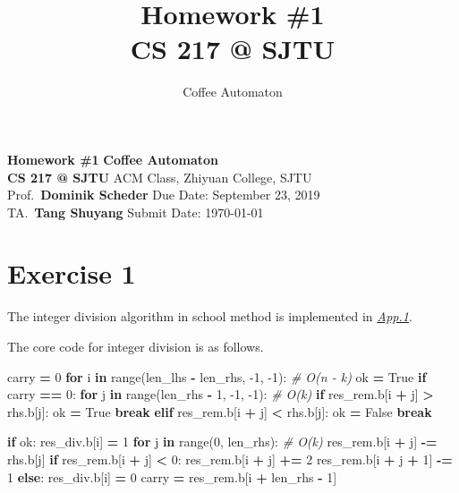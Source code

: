 \documentclass[
]{article}
\title{
  \vspace{2in}
  \textmd{\textbf{Homework \#1}}
  \normalsize\vspace{0.1in}\\
  \textmd{\textbf{CS 217 @ SJTU}}
  \normalsize\vspace{0.1in}\\
}
\author{Coffee Automaton}
\date{}
\newenvironment{Shaded}{\begin{snugshade}}{\end{snugshade}}
\newcommand{\BuiltInTok}[1]{#1}
\newcommand{\CommentTok}[1]{\textcolor[rgb]{0.56,0.35,0.01}{\textit{#1}}}
\newcommand{\ControlFlowTok}[1]{\textcolor[rgb]{0.13,0.29,0.53}{\textbf{#1}}}
\newcommand{\DecValTok}[1]{\textcolor[rgb]{0.00,0.00,0.81}{#1}}
\newcommand{\KeywordTok}[1]{\textcolor[rgb]{0.13,0.29,0.53}{\textbf{#1}}}
\newcommand{\NormalTok}[1]{#1}
\newcommand{\OperatorTok}[1]{\textcolor[rgb]{0.81,0.36,0.00}{\textbf{#1}}}
\newcommand{\VariableTok}[1]{\textcolor[rgb]{0.00,0.00,0.00}{#1}}
\begin{document}
\noindent
\large\textbf{Homework \#1}
\hfill
\textbf{Coffee Automaton} \\
\normalsize {\bf CS 217 @ SJTU} \hfill ACM Class, Zhiyuan College, SJTU\\
Prof.~{\bf Dominik Scheder} \hfill Due Date: September 23, 2019\\
  TA.~{\bf Tang Shuyang}
\hfill Submit Date: \today


\hypertarget{exercise-1}{%
\section{Exercise 1}\label{exercise-1}}

The integer division algorithm in school method is implemented in
\emph{\protect\hyperlink{appendix-1-euclidean-algorithm}{App.1}}.

The core code for integer division is as follows.

\begin{Shaded}
\begin{Highlighting}[]
\NormalTok{carry }\OperatorTok{=} \DecValTok{0}
\ControlFlowTok{for}\NormalTok{ i }\KeywordTok{in} \BuiltInTok{range}\NormalTok{(len_lhs }\OperatorTok{-}\NormalTok{ len_rhs, }\DecValTok{-1}\NormalTok{, }\DecValTok{-1}\NormalTok{):  }\CommentTok{# O(n - k)}
\NormalTok{    ok }\OperatorTok{=} \VariableTok{True}
    \ControlFlowTok{if}\NormalTok{ carry }\OperatorTok{==} \DecValTok{0}\NormalTok{:}
        \ControlFlowTok{for}\NormalTok{ j }\KeywordTok{in} \BuiltInTok{range}\NormalTok{(len_rhs }\OperatorTok{-} \DecValTok{1}\NormalTok{, }\DecValTok{-1}\NormalTok{, }\DecValTok{-1}\NormalTok{):  }\CommentTok{# O(k)}
            \ControlFlowTok{if}\NormalTok{ res_rem.b[i }\OperatorTok{+}\NormalTok{ j] }\OperatorTok{>}\NormalTok{ rhs.b[j]:}
\NormalTok{                ok }\OperatorTok{=} \VariableTok{True}
                \ControlFlowTok{break}
            \ControlFlowTok{elif}\NormalTok{ res_rem.b[i }\OperatorTok{+}\NormalTok{ j] }\OperatorTok{<}\NormalTok{ rhs.b[j]:}
\NormalTok{                ok }\OperatorTok{=} \VariableTok{False}
                \ControlFlowTok{break}
  
    \ControlFlowTok{if}\NormalTok{ ok:}
\NormalTok{        res_div.b[i] }\OperatorTok{=} \DecValTok{1}
        \ControlFlowTok{for}\NormalTok{ j }\KeywordTok{in} \BuiltInTok{range}\NormalTok{(}\DecValTok{0}\NormalTok{, len_rhs):  }\CommentTok{# O(k)}
\NormalTok{            res_rem.b[i }\OperatorTok{+}\NormalTok{ j] }\OperatorTok{-=}\NormalTok{ rhs.b[j]}
            \ControlFlowTok{if}\NormalTok{ res_rem.b[i }\OperatorTok{+}\NormalTok{ j] }\OperatorTok{<} \DecValTok{0}\NormalTok{:}
\NormalTok{                res_rem.b[i }\OperatorTok{+}\NormalTok{ j] }\OperatorTok{+=} \DecValTok{2}
\NormalTok{                res_rem.b[i }\OperatorTok{+}\NormalTok{ j }\OperatorTok{+} \DecValTok{1}\NormalTok{] }\OperatorTok{-=} \DecValTok{1}
    \ControlFlowTok{else}\NormalTok{:}
\NormalTok{        res_div.b[i] }\OperatorTok{=} \DecValTok{0}
\NormalTok{    carry }\OperatorTok{=}\NormalTok{ res_rem.b[i }\OperatorTok{+}\NormalTok{ len_rhs }\OperatorTok{-} \DecValTok{1}\NormalTok{]}
  
\end{Highlighting}
\end{Shaded}
\end{document}
